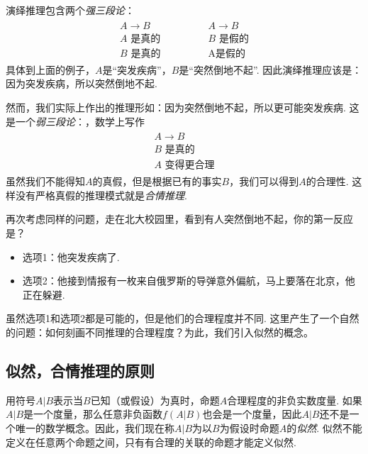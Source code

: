 演绎推理包含两个\emph{强三段论}：
    \[
        \begin{array}{c}
            \begin{array}{c}  
                A \to B \\ A\text{ 是真的} \\ \hline B\text{ 是真的}
            \end{array} 
            \qquad \qquad 
            \begin{array}{c}  
                A \to B \\ B\text{ 是假的} \\ \hline \text{A是假的}
            \end{array}
        \end{array} 
    \]
具体到上面的例子，$A$是``突发疾病''，$B$是``突然倒地不起''. 因此演绎推理应该是：因为突发疾病，所以突然倒地不起.

然而，我们实际上作出的推理形如：因为突然倒地不起，所以更可能突发疾病. 这是一个\emph{弱三段论}：，数学上写作 
        \[
        \begin{array}{c}
            \begin{array}{c}  
                A \to B \\ B\text{ 是真的} \\ \hline A\text{ 变得更合理}
            \end{array} 
        \end{array} 
    \]
虽然我们不能得知$A$的真假，但是根据已有的事实$B$，我们可以得到$A$的合理性. 这样没有严格真假的推理模式就是\emph{合情推理}.


再次考虑同样的问题，走在北大校园里，看到有人突然倒地不起，你的第一反应是？
    \begin{itemize}
        \item 选项1：他突发疾病了.
        \item 选项2：他接到情报有一枚来自俄罗斯的导弹意外偏航，马上要落在北京，他正在躲避.
    \end{itemize}
虽然选项1和选项2都是可能的，但是他们的合理程度并不同. 这里产生了一个自然的问题：如何刻画不同推理的合理程度？为此，我们引入似然的概念。


\subsection{似然，合情推理的原则}

用符号$A|B$表示当$B$已知（或假设）为真时，命题$A$合理程度的非负实数度量. 如果$A|B$是一个度量，那么任意非负函数$f(A|B)$也会是一个度量，因此$A|B$还不是一个唯一的数学概念。因此，我们现在称$A|B$为以$B$为假设时命题$A$的\emph{似然}. 似然不能定义在任意两个命题之间，只有有合理的关联的命题才能定义似然.

